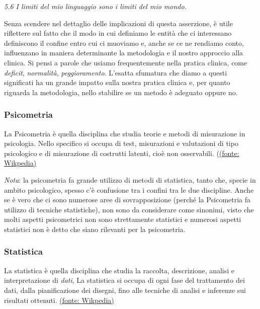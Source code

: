 \documentclass[
  italian,
  letterpaper,
  paper=A4,
  headinclude=on,
  footinclude=on,
  12pt]{scrbook}
\begin{document}
\emph{5.6 I limiti del mio linguaggio sono i limiti del mio mondo.}

Senza scendere nel dettaglio delle implicazioni di questa asserzione, è
utile riflettere sul fatto che il modo in cui definiamo le entità che ci
interessano definiscono il confine entro cui ci muoviamo e, anche se ce
ne rendiamo conto, influenzano in maniera determinante la metodologia e
il nostro approccio alla clinica. Si pensi a parole che usiamo
frequentemente nella pratica clinica, come \emph{deficit},
\emph{normalità}, \emph{peggioramento}. L'esatta sfumatura che diamo a
questi significati ha un grande impatto sulla nostra pratica clinica e,
per quanto riguarda la metodologia, nello stabilire se un metodo è
adeguato oppure no.

\subsubsection*{Psicometria}\label{psicometria}

La Psicometria è quella disciplina che studia teorie e metodi di
misurazione in psicologia. Nello specifico si occupa di test,
misurazioni e valutazioni di tipo psicologico e di misurazione di
costrutti latenti, cioè non osservabili.
(\href{https://en.wikipedia.org/w/index.php?title=Psychometrics&oldid=1307897603}{(fonte:
Wikpedia)}

\emph{Nota}: la psicometria fa grande utilizzo di metodi di statistica,
tanto che, specie in ambito psicologico, spesso c'è confusione tra i
confini tra le due discipline. Anche se è vero che ci sono numerose aree
di sovrapposizione (perché la Psicometria fa utilizzo di tecniche
statistiche), non sono da considerare come sinonimi, visto che molti
aspetti psicometrici non sono strettamente statistici e numerosi aspetti
statistici non è detto che siano rilevanti per la psicometria.

\subsubsection*{Statistica}\label{statistica}

La statistica è quella disciplina che studia la raccolta, descrizione,
analisi e interpretazione di \emph{dati}, La statistica si occupa di
ogni fase del trattamento dei dati, dalla pianificazione dei disegni,
fino alle tecniche di analisi e inferenze sui risultati ottenuti.
\href{https://en.wikipedia.org/w/index.php?title=Statistics&oldid=1307451692}{(fonte:
Wikpedia)}
\end{document}
